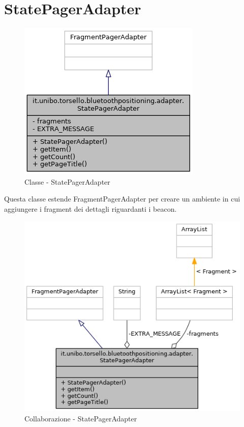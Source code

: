 \section{StatePagerAdapter}
\begin{figure}[ph]
	\centering
	\includegraphics[width=0.5\linewidth]{img/uml/class/classit_1_1unibo_1_1torsello_1_1bluetoothpositioning_1_1adapter_1_1StatePagerAdapter__inherit__graph.png}
	\caption{Classe - StatePagerAdapter}
\end{figure}

Questa classe estende FragmentPagerAdapter per creare un ambiente in cui aggiungere i fragment dei dettagli riguardanti i beacon.

\begin{figure}[ph]
	\centering
	\includegraphics[width=0.75\linewidth]{img/uml/class/classit_1_1unibo_1_1torsello_1_1bluetoothpositioning_1_1adapter_1_1StatePagerAdapter__coll__graph.png}
	\caption{Collaborazione - StatePagerAdapter}
\end{figure}

\newpage
